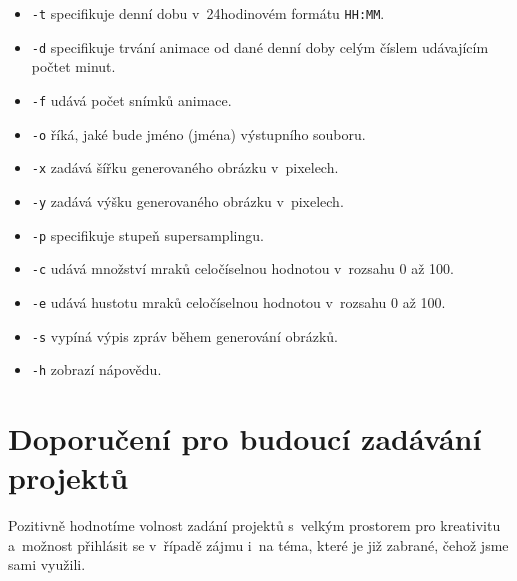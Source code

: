 \documentclass[12pt,a4paper,titlepage,final]{report}
\begin{document}
\begin{itemize}
\item {\tt -t} specifikuje denní dobu v~24hodinovém formátu {\tt HH:MM}.
\item {\tt -d} specifikuje trvání animace od dané denní doby celým číslem udávajícím počtet minut.
\item {\tt -f} udává počet snímků animace.
\item {\tt -o} říká, jaké bude jméno (jména) výstupního souboru.
\item {\tt -x} zadává šířku generovaného obrázku v~pixelech.
\item {\tt -y} zadává výšku generovaného obrázku v~pixelech.
\item {\tt -p} specifikuje stupeň supersamplingu.
\item {\tt -c} udává množství mraků celočíselnou hodnotou v~rozsahu 0 až 100.
\item {\tt -e} udává hustotu mraků celočíselnou hodnotou v~rozsahu 0 až 100.
\item {\tt -s} vypíná výpis zpráv během generování obrázků.
\item {\tt -h} zobrazí nápovědu.
\end{itemize}

\chapter{Doporučení pro budoucí zadávání projektů}

Pozitivně hodnotíme volnost zadání projektů s~velkým prostorem pro
kreativitu a~možnost přihlásit se v~řípadě zájmu i~na téma, které je již
zabrané, čehož jsme sami využili.




\nocite{cite1}
\nocite{cite2}
\nocite{cite3}


\end{document}
